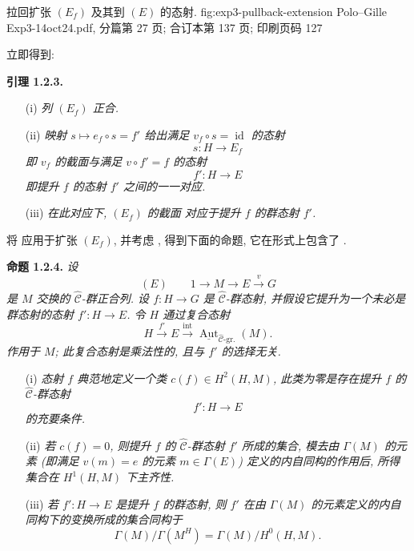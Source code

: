   {拉回扩张 \((E_f)\) 及其到 \((E)\) 的态射.}
  {fig:exp3-pullback-extension}
  {Polo--Gille Exp3-14oct24.pdf, 分篇第 27 页; 合订本第 137 页; 印刷页码 127}

立即得到:

\medskip
\noindent{}\textbf{引理 1.2.3.}
\begin{enumerate}
 \item[(i)] \textit{列 \((E_f)\) 正合.}

 \item[(ii)] \textit{映射 \(s\mapsto e_f\circ s=f'\)
 给出满足 \(v_f\circ s=\operatorname{id}\) 的态射}
 \[
  s:H\longrightarrow E_f
 \]
 \textit{即 \(v_f\) 的截面与满足 \(v\circ f'=f\) 的态射}
 \[
  f':H\longrightarrow E
 \]
 \textit{即提升 \(f\) 的态射 \(f'\) 之间的一一对应.}

 \item[(iii)] \textit{在此对应下, \((E_f)\) 的截面
 对应于提升 \(f\) 的群态射 \(f'\).}
\end{enumerate}

将  应用于扩张 \((E_f)\),
并考虑 , 得到下面的命题,
它在形式上包含了 .

\medskip
\noindent{}\textbf{命题 1.2.4.}
\textit{设}
\[
 (E)\qquad 1\longrightarrow M\longrightarrow E\xrightarrow{v}G
\]
\textit{是 \(M\) 交换的 \(\widehat{\mathscr C}\)-群正合列.
设 \(f:H\to G\) 是 \(\widehat{\mathscr C}\)-群态射,
并假设它提升为一个未必是群态射的态射 \(f':H\to E\).
令 \(H\) 通过复合态射}
\[
 H\xrightarrow{f'}E\xrightarrow{\operatorname{int}}
 \underline{\operatorname{Aut}}_{\widehat{\mathscr C}\text{-gr.}}(M).
\]
\textit{作用于 \(M\); 此复合态射是乘法性的, 且与 \(f'\) 的选择无关.}
\begin{enumerate}
 \item[(i)] \textit{态射 \(f\) 典范地定义一个类
 \(c(f)\in H^2(H,M)\), 此类为零是存在提升 \(f\)
 的 \(\widehat{\mathscr C}\)-群态射}
 \[
  f':H\longrightarrow E
 \]
 \textit{的充要条件.}

 \item[(ii)] \textit{若 \(c(f)=0\), 则提升 \(f\) 的
 \(\widehat{\mathscr C}\)-群态射 \(f'\) 所成的集合,
 模去由 \(\Gamma(M)\) 的元素 (即满足 \(v(m)=e\) 的元素
 \(m\in\Gamma(E)\)) 定义的内自同构的作用后,
 所得集合在 \(H^1(H,M)\) 下主齐性.}

 \item[\SGAInlineRefTarget{sga3:iii:proposition:1-2-4:item:iii}(iii)]
 \textit{若 \(f':H\to E\) 是提升 \(f\) 的群态射,
 则 \(f'\) 在由 \(\Gamma(M)\) 的元素定义的内自同构下的变换所成的集合同构于}
 \[
  \Gamma(M)/\Gamma(M^H)=\Gamma(M)/H^0(H,M).
 \]
\end{enumerate}

